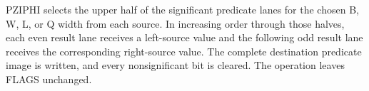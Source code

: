 PZIPHI selects the upper half of the significant predicate lanes for the chosen B, W, L, or Q width from each source.
In increasing order through those halves, each even result lane receives a left-source value and the following odd result lane receives the corresponding right-source value.
The complete destination predicate image is written, and every nonsignificant bit is cleared.
The operation leaves FLAGS unchanged.
